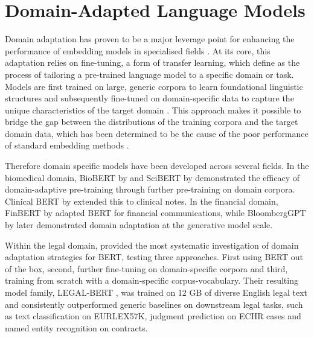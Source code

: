 \section{Domain-Adapted Language Models}

Domain adaptation has proven to be a major leverage point for enhancing the performance of embedding models in specialised fields \cite{gururangan_dont_2020}. At its core, this adaptation relies on fine-tuning, a form of transfer learning, which \citet{Jurafsky2024_SLP} define as the process of tailoring a pre-trained language model to a specific domain or task. Models are first trained on large, generic corpora to learn foundational linguistic structures and subsequently fine-tuned on domain-specific data to capture the unique characteristics of the target domain \cite{gururangan_dont_2020}. This approach makes it possible to bridge the gap between the distributions of the training corpora and the target domain data, which has been determined to be the cause of the poor performance of standard embedding methods \cite{Lee_2019_BioBERT, beltragy_2019_scibert,gururangan_dont_2020,chalkidis-etal-2020-legal}.

Therefore domain specific models have been developed across several fields. In the biomedical domain, Bio\ac{BERT} by \citet{Lee_2019_BioBERT} and Sci\ac{BERT} by \citet{beltragy_2019_scibert} demonstrated the efficacy of domain-adaptive pre-training through further pre-training on domain corpora. Clinical \ac{BERT}  by \citet{alsentzer_2019_clinical_bert} extended this to clinical notes. In the financial domain, Fin\ac{BERT} by \citet{yang_finbert_2020} adapted \ac{BERT}  for financial communications, while BloombergGPT by \citet{wu2023bloomberggpt} later demonstrated domain adaptation at the generative model scale.

Within the legal domain, \citet{chalkidis-etal-2020-legal} provided the most systematic investigation of domain adaptation strategies for \ac{BERT}, testing three approaches. First using \ac{BERT}  out of the box, second, further fine-tuning on domain-specific corpora and third, training from scratch with a domain-specific corpus-vocabulary. Their resulting model family, LEGAL-\ac{BERT} , was trained on 12 GB of diverse English legal text and consistently outperformed generic baselines on downstream legal tasks, such as text classification on EURLEX57K, judgment prediction on ECHR cases and named entity recognition on contracts.  


